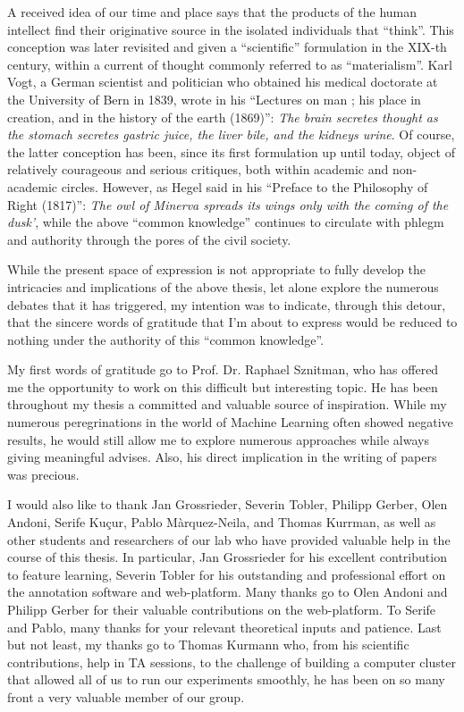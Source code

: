 \begin{acknowledgements}
\addchaptertocentry{\acknowledgementname} %
A received idea of our time and place says that the products of the human intellect find their originative source in the isolated individuals that ``think''.
This conception was later revisited and given a ``scientific'' formulation in the XIX-th century, within a current of thought commonly referred to as ``materialism''.
Karl Vogt, a German scientist and politician who obtained his medical doctorate at the University of Bern in 1839, wrote in his ``Lectures on man ; his place in creation, and in the history of the earth (1869)'':
\textit{The brain secretes thought as the stomach secretes gastric juice, the liver bile, and the kidneys urine}.
Of course, the latter conception has been, since its first formulation up until today, object of relatively courageous and serious critiques, both within academic and non-academic circles.
However, as Hegel said in his ``Preface to the Philosophy of Right (1817)'': \textit{The owl of Minerva spreads its wings only with the coming of the dusk’}, while the above ``common knowledge'' continues to circulate with phlegm and authority through the pores of the civil society.

While the present space of expression is not appropriate to fully develop the intricacies and implications of the above thesis, let alone explore the numerous debates that it has triggered, my intention was to indicate, through this detour, that the sincere words of gratitude that I'm about to express would be reduced to nothing under the authority of this ``common knowledge''.

\bigskip
My first words of gratitude go to Prof. Dr. Raphael Sznitman, who has offered me the opportunity to work on this difficult but interesting topic.
He has been throughout my thesis a committed and valuable source of inspiration.
While my numerous peregrinations in the world of Machine Learning often showed negative results, he would still allow me to explore numerous approaches while always giving meaningful advises.
Also, his direct implication in the writing of papers was precious.

\bigskip
I would also like to thank Jan Grossrieder, Severin Tobler, Philipp Gerber, Olen Andoni, Serife Kuçur, Pablo Màrquez-Neila, and Thomas Kurrman, as well as other students and researchers of our lab who have provided valuable help in the course of this thesis.
In particular, Jan Grossrieder for his excellent contribution to feature learning, Severin Tobler for his outstanding and professional effort on the annotation software and web-platform.
Many thanks go to Olen Andoni and Philipp Gerber for their valuable contributions on the web-platform.
To Serife and Pablo, many thanks for your relevant theoretical inputs and patience.
Last but not least, my thanks go to Thomas Kurmann who, from his scientific contributions, help in TA sessions, to the challenge of building a computer cluster that allowed all of us to run our experiments smoothly, he has been on so many front a very valuable member of our group.


\end{acknowledgements}
